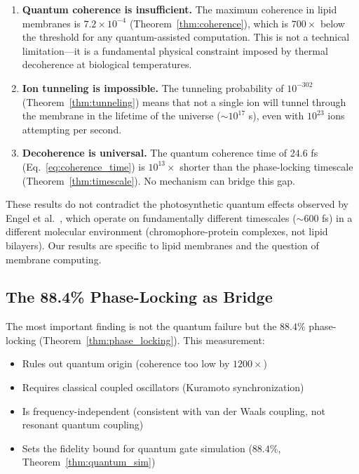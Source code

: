\documentclass[twocolumn,10pt,a4paper]{article}
\theoremstyle{definition}
\theoremstyle{remark}
\begin{document}
\begin{enumerate}[leftmargin=2em]
    \item \textbf{Quantum coherence is insufficient.} The maximum coherence in lipid membranes is $7.2 \times 10^{-4}$ (Theorem~\ref{thm:coherence}), which is $700\times$ below the threshold for any quantum-assisted computation. This is not a technical limitation---it is a fundamental physical constraint imposed by thermal decoherence at biological temperatures.

    \item \textbf{Ion tunneling is impossible.} The tunneling probability of $10^{-302}$ (Theorem~\ref{thm:tunneling}) means that not a single ion will tunnel through the membrane in the lifetime of the universe ($\sim 10^{17}$ s), even with $10^{23}$ ions attempting per second.

    \item \textbf{Decoherence is universal.} The quantum coherence time of 24.6 fs (Eq.~\ref{eq:coherence_time}) is $10^{13}\times$ shorter than the phase-locking timescale (Theorem~\ref{thm:timescale}). No mechanism can bridge this gap.
\end{enumerate}

These results do not contradict the photosynthetic quantum effects observed by Engel et al.~\citep{engel2007evidence}, which operate on fundamentally different timescales ($\sim 600$ fs) in a different molecular environment (chromophore-protein complexes, not lipid bilayers). Our results are specific to lipid membranes and the question of membrane computing.

\subsection{The 88.4\% Phase-Locking as Bridge}

The most important finding is not the quantum failure but the $88.4\%$ phase-locking (Theorem~\ref{thm:phase_locking}). This measurement:
\begin{itemize}[leftmargin=2em]
    \item Rules out quantum origin (coherence too low by $1200\times$)
    \item Requires classical coupled oscillators (Kuramoto synchronization)
    \item Is frequency-independent (consistent with van der Waals coupling, not resonant quantum coupling)
    \item Sets the fidelity bound for quantum gate simulation ($88.4\%$, Theorem~\ref{thm:quantum_sim})
\end{itemize}
\end{document}
